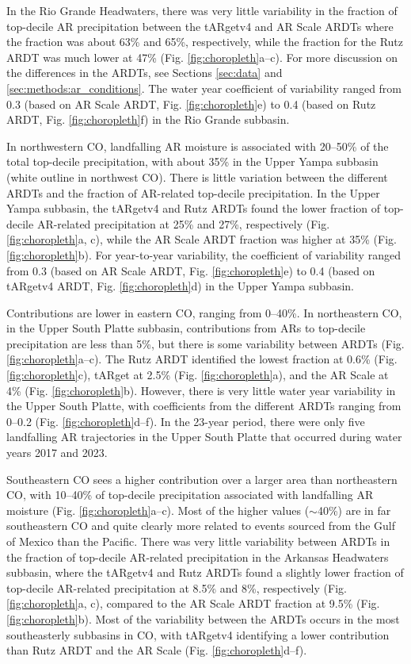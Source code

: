 \documentclass[draft]{agujournal2019}
\begin{document}
In the Rio Grande Headwaters, there was very little variability in the fraction of top-decile AR precipitation between the tARgetv4 and AR Scale ARDTs where the fraction was about 63\% and 65\%, respectively, while the fraction for the Rutz ARDT was much lower at 47\% (Fig. \ref{fig:choropleth}a--c). For more discussion on the differences in the ARDTs, see Sections \ref{sec:data} and \ref{sec:methods:ar_conditions}. The water year coefficient of variability ranged from 0.3 (based on AR Scale ARDT, Fig. \ref{fig:choropleth}e) to 0.4 (based on Rutz ARDT, Fig. \ref{fig:choropleth}f) in the Rio Grande subbasin.

In northwestern CO, landfalling AR moisture is associated with 20--50\% of the total top-decile precipitation, with about 35\% in the Upper Yampa subbasin (white outline in northwest CO). There is little variation between the different ARDTs and the fraction of AR-related top-decile precipitation. In the Upper Yampa subbasin, the tARgetv4 and Rutz ARDTs found the lower fraction of top-decile AR-related precipitation at 25\% and 27\%, respectively (Fig. \ref{fig:choropleth}a, c), while the AR Scale ARDT fraction was higher at 35\% (Fig. \ref{fig:choropleth}b). For year-to-year variability, the coefficient of variability ranged from 0.3 (based on AR Scale ARDT, Fig. \ref{fig:choropleth}e) to 0.4 (based on tARgetv4 ARDT, Fig. \ref{fig:choropleth}d) in the Upper Yampa subbasin.

Contributions are lower in eastern CO, ranging from 0--40\%. In northeastern CO, in the Upper South Platte subbasin, contributions from ARs to top-decile precipitation are less than 5\%, but there is some variability between ARDTs (Fig. \ref{fig:choropleth}a--c). The Rutz ARDT identified the lowest fraction at 0.6\% (Fig. \ref{fig:choropleth}c), tARget at 2.5\% (Fig. \ref{fig:choropleth}a), and the AR Scale at 4\% (Fig. \ref{fig:choropleth}b). However, there is very little water year variability in the Upper South Platte, with coefficients from the different ARDTs ranging from 0--0.2 (Fig. \ref{fig:choropleth}d--f). In the 23-year period, there were only five landfalling AR trajectories in the Upper South Platte that occurred during water years 2017 and 2023. 

Southeastern CO sees a higher contribution over a larger area than northeastern CO, with 10--40\% of top-decile precipitation associated with landfalling AR moisture (Fig. \ref{fig:choropleth}a--c). Most of the higher values ($\sim$40\%) are in far southeastern CO and quite clearly more related to events sourced from the Gulf of Mexico than the Pacific. There was very little variability between ARDTs in the fraction of top-decile AR-related precipitation in the Arkansas Headwaters subbasin, where the tARgetv4 and Rutz ARDTs found a slightly lower fraction of top-decile AR-related precipitation at 8.5\% and 8\%, respectively (Fig. \ref{fig:choropleth}a, c), compared to the AR Scale ARDT fraction at 9.5\% (Fig. \ref{fig:choropleth}b). Most of the variability between the ARDTs occurs in the most southeasterly subbasins in CO, with tARgetv4 identifying a lower contribution than Rutz ARDT and the AR Scale (Fig. \ref{fig:choropleth}d--f).
\end{document}
